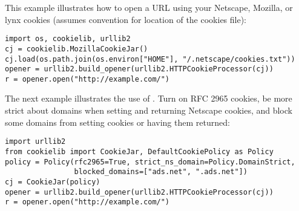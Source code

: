 This example illustrates how to open a URL using your Netscape,
Mozilla, or lynx cookies (assumes \UNIX{} convention for location of
the cookies file):

\begin{verbatim}
import os, cookielib, urllib2
cj = cookielib.MozillaCookieJar()
cj.load(os.path.join(os.environ["HOME"], "/.netscape/cookies.txt"))
opener = urllib2.build_opener(urllib2.HTTPCookieProcessor(cj))
r = opener.open("http://example.com/")
\end{verbatim}

The next example illustrates the use of .
Turn on RFC 2965 cookies, be more strict about domains when setting
and returning Netscape cookies, and block some domains from setting
cookies or having them returned:

\begin{verbatim}
import urllib2
from cookielib import CookieJar, DefaultCookiePolicy as Policy
policy = Policy(rfc2965=True, strict_ns_domain=Policy.DomainStrict,
                blocked_domains=["ads.net", ".ads.net"])
cj = CookieJar(policy)
opener = urllib2.build_opener(urllib2.HTTPCookieProcessor(cj))
r = opener.open("http://example.com/")
\end{verbatim}
